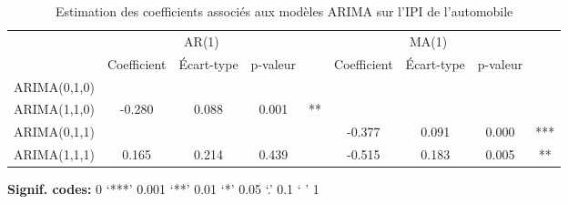 \documentclass[]{article}
\begin{document}
\begin{table}[!h]

\caption{\label{tab:tabcoefs}Estimation des coefficients associés aux modèles ARIMA sur l'IPI de l'automobile}
\centering
\begin{threeparttable}
\begin{tabular}[t]{lcccccccc}
\toprule
\multicolumn{1}{c}{ } & \multicolumn{3}{c}{AR(1)} & \multicolumn{1}{c}{ } & \multicolumn{3}{c}{MA(1)} & \multicolumn{1}{c}{ } \\
\cmidrule(l{3pt}r{3pt}){2-4} \cmidrule(l{3pt}r{3pt}){6-8}
  & Coefficient & Écart-type & p-valeur &  & Coefficient & Écart-type & p-valeur & \\
\midrule
ARIMA(0,1,0) &  &  &  &  &  &  &  & \\
ARIMA(1,1,0) & -0.280 & 0.088 & 0.001 & ** &  &  &  & \\
ARIMA(0,1,1) &  &  &  &  & -0.377 & 0.091 & 0.000 & ***\\
ARIMA(1,1,1) & 0.165 & 0.214 & 0.439 &  & -0.515 & 0.183 & 0.005 & **\\
\bottomrule
\end{tabular}
\begin{tablenotes}
\item \hspace{-0.4cm}\textbf{Signif. codes: }0 `***' 0.001 `**' 0.01 `*' 0.05 `.' 0.1 ` ' 1
\end{tablenotes}
\end{threeparttable}
\end{table}
\end{document}
